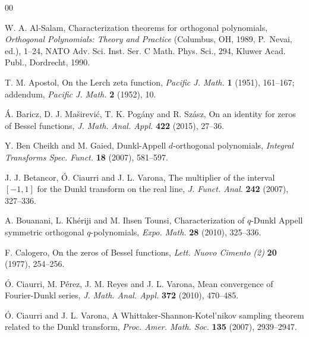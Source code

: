 \documentclass[10pt,a4paper]{article}
\theoremstyle{plain}
\theoremstyle{definition}
\numberwithin{equation}{section} %
\begin{document}
\begin{thebibliography}{00}

W. A. Al-Salam,
Characterization theorems for orthogonal polynomials,
\textit{Orthogonal Polynomials: Theory and Practice}
(Columbus, OH, 1989, P.~Nevai, ed.), 1--24,
NATO Adv. Sci. Inst. Ser. C Math. Phys. Sci., 294,
Kluwer Acad. Publ., Dordrecht, 1990.

T. M. Apostol,
On the Lerch zeta function,
\textit{Pacific J. Math.} \textbf{1} (1951), 161--167;
addendum, \textit{Pacific J. Math.} \textbf{2} (1952), 10.

\'A. Baricz, D. J. Ma\v{s}irevi\'c, T. K. Pog\'any and R. Sz\'asz,
On an identity for zeros of Bessel functions,
\textit{J. Math. Anal. Appl.}
\textbf{422} (2015), 27--36.

Y. Ben Cheikh and M. Gaied,
Dunkl-Appell $d$-orthogonal polynomials,
\textit{Integral Transforms Spec. Funct.}
\textbf{18} (2007), 581--597.

J. J. Betancor, \'O. Ciaurri and J. L. Varona,
The multiplier of the interval $[-1,1]$ for the Dunkl transform on the real line,
\textit{J. Funct. Anal.}
\textbf{242} (2007), 327--336.

A. Bouanani, L. Kh\'eriji and M. Ihsen Tounsi,
Characterization of $q$-Dunkl Appell symmetric orthogonal $q$-polynomials,
\textit{Expo. Math.}
\textbf{28} (2010), 325--336.

F. Calogero,
On the zeros of Bessel functions,
\textit{Lett. Nuovo Cimento (2)}
\textbf{20} (1977), 254--256.

\'O. Ciaurri, M. P\'erez, J. M. Reyes and J. L. Varona,
Mean convergence of Fourier-Dunkl series,
\textit{J. Math. Anal. Appl.}
\textbf{372} (2010), 470--485.

\'O. Ciaurri and J. L. Varona,
A Whittaker-Shannon-Kotel'nikov sampling theorem related to the Dunkl transform,
\textit{Proc. Amer. Math. Soc.}
\textbf{135} (2007), 2939--2947.


\end{thebibliography}
\end{document}

